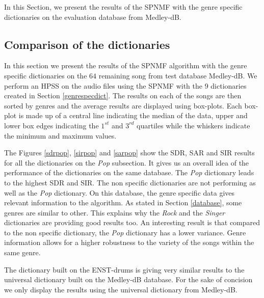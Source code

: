 \documentclass{article}
\begin{document}
In this Section, we present the results of the SPNMF with the genre specific dictionaries on the evaluation database from Medley-dB.

\subsection{Comparison of the dictionaries}

In this section we present the results of the SPNMF algorithm with the genre specific dictionaries on the $64$ remaining song from test database Medley-dB. We perform an HPSS on the audio files using the SPNMF with the $9$ dictionaries created in Section \ref{genrespecdict}. The results on each of the songs are then sorted by genres and the average results are displayed using box-plots. Each box-plot is made up of a central line indicating the median of the data, upper and lower box edges indicating the $1^{st}$ and $3^{rd}$ quartiles while the whiskers indicate the minimum and maximum values. 


The Figures \ref{sdrpop}, \ref{sirpop} and \ref{sarpop} show the SDR, SAR and SIR results for all the dictionaries on the \emph{Pop} subsection. It gives us an overall idea of the performance of the dictionaries on the same database. The \emph{Pop} dictionary leads to the highest SDR and SIR. The non specific dictionaries are not performing as well as the \emph{Pop} dictionary. On this database, the genre specific data gives relevant information to the algorithm. As stated in Section \ref{database}, some genres are similar to other. This explains why the \emph{Rock} and the \emph{Singer} dictionaries are providing good results too. 
An interesting result is that compared to the non specific dictionary, the \emph{Pop} dictionary has a lower variance. Genre information allows for a higher robustness to the variety of the songs within the same genre.  

The dictionary built on the ENST-drums is giving very similar results to the universal dictionary built on the Medley-dB database. For the sake of concision we only display the results using the universal dictionary from Medley-dB. 
\end{document}
